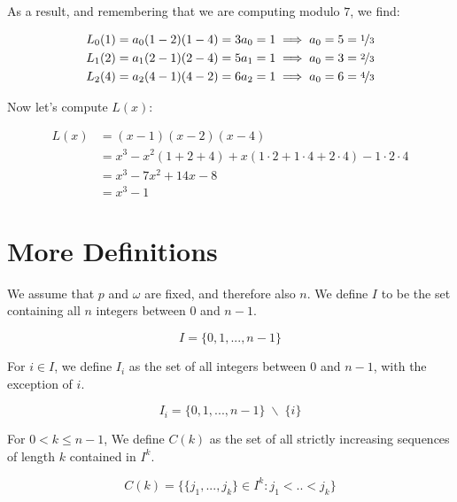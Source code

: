 \documentclass[a4paper]{article}
\begin{document}
As a result, and remembering that we are computing modulo $7$, we find:

\begin{equation}
  \begin{aligned}
    L_0(1) &= a_0(1 - 2)(1 - 4) = 3a_0 = 1 \implies a_0 = 5 = \nicefrac{1}{3} \\
    L_1(2) &= a_1(2 - 1)(2 - 4) = 5a_1 = 1 \implies a_0 = 3 = \nicefrac{2}{3} \\
    L_2(4) &= a_2(4 - 1)(4 - 2) = 6a_2 = 1 \implies a_0 = 6 = \nicefrac{4}{3} \\
  \end{aligned}
\end{equation}

Now let's compute $L(x)$:

\begin{equation}
  \begin{aligned}
    L(x) &= (x-1)(x-2)(x-4) \\
         &= x^3 - x^2(1+2+4) + x(1\cdot2 + 1\cdot4 + 2\cdot4) - 1\cdot2\cdot4 \\
         &= x^3 - 7x^2 + 14x - 8 \\
         &= x^3 - 1
  \end{aligned}
\end{equation}



\section{More Definitions}

We assume that $p$ and $\omega$ are fixed, and therefore also $n$. We define $I$ to be the set containing all $n$ integers between $0$ and $n-1$.

\begin{equation}
  I = \{0, 1, ..., n-1\}
\end{equation}

For $i \in I$, we define $I_i$ as the set of all integers between $0$ and $n-1$, with the exception of $i$.

\begin{equation}
  I_i = \{0, 1, ..., n-1\} \; \backslash \; \{i\}
\end{equation}

For $0 < k \le n-1$, We define $C(k)$ as the set of all strictly increasing sequences of length $k$ contained in $I^k$. 

\begin{equation}
  C(k) = \{ \{j_1, ..., j_k\} \in I^k : j_1 < .. < j_k \}
\end{equation}
\end{document}
